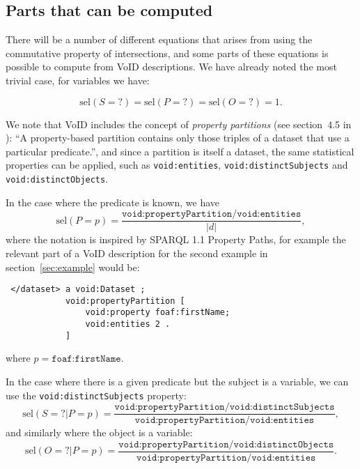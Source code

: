 \documentclass[12pt, draft]{article}
\newcommand{\rdfterm}[1]{\texttt{#1}}
\newcommand{\sel}[1]{\ensuremath{\mathrm{sel}\left(#1\right)}}
\begin{document}
\subsection{Parts that can be computed}

There will be a number of different equations that arises from using
the commutative property of intersections, and some parts of these
equations is possible to compute from VoID descriptions. We have
already noted the most trivial case, for variables we have:

\begin{equation}\label{eq:selvar}
\sel{S = ?} = \sel{P = ?} = \sel{O = ?} = 1 .
\end{equation}

We note that VoID includes the concept of \emph{property partitions}
(see section~4.5 in \cite{voidnote}): ``A property-based partition
contains only those triples of a dataset that use a particular
predicate.'', and since a partition is itself a dataset, the same
statistical properties can be applied, such as \rdfterm{void:entities},
\rdfterm{void:distinctSubjects} and \rdfterm{void:distinctObjects}.

In the case where the predicate is known, we have
\begin{equation}\label{eq:selPp}
 \sel{P = p} =
   \frac{\rdfterm{void:propertyPartition/void:entities}}{|d|} ,
\end{equation}
where the notation is inspired by SPARQL 1.1 Property Paths, for
example the relevant part of a VoID description for the second example
in section~\ref{sec:example} would be:
\begin{verbatim}
 </dataset> a void:Dataset ;
            void:propertyPartition [
                void:property foaf:firstName;
                void:entities 2 .
            ]
\end{verbatim}
where $p = \rdfterm{foaf:firstName}$.


In the case where there is a given predicate but the subject is a
variable, we can use the \rdfterm{void:distinctSubjects} property:
\begin{equation}\label{eq:selSvPp}
 \sel{S = ? | P = p} =
   \frac{\rdfterm{void:propertyPartition/void:distinctSubjects}}{\rdfterm{void:propertyPartition/void:entities}} ,
\end{equation}
and similarly where the object is a variable:
\begin{equation}\label{eq:selOvPp}
 \sel{O = ? | P = p} =
   \frac{\rdfterm{void:propertyPartition/void:distinctObjects}}{\rdfterm{void:propertyPartition/void:entities}} .
\end{equation}
\end{document}
